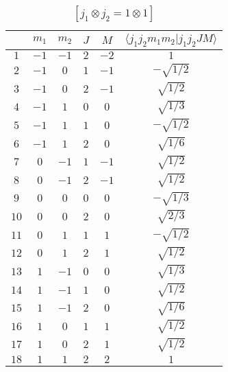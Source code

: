 \begin{table}
\tiny
\caption{$[j_1 \otimes j_2 = 1 \otimes 1]$}
\begin{center}
\begin{tabular}{|c|c|c|c|c|c|}
\hline 
   & $m_1$ & $m_2$ & $J$ & $M$ & $\langle j_1 j_2 m_1 m_2 | j_1 j_2 J M \rangle$ \\ 
\hline 
$1$ & $-1$ & $-1$ & $2$ & $-2$ & $1$ \\ 
$2$ & $-1$ & $0$ & $1$ & $-1$ & $-\sqrt{1/2}$ \\ 
$3$ & $-1$ & $0$ & $2$ & $-1$ & $\sqrt{1/2}$ \\ 
$4$ & $-1$ & $1$ & $0$ & $0$ & $\sqrt{1/3}$ \\ 
$5$ & $-1$ & $1$ & $1$ & $0$ & $-\sqrt{1/2}$ \\ 
$6$ & $-1$ & $1$ & $2$ & $0$ & $\sqrt{1/6}$ \\ 
$7$ & $0$ & $-1$ & $1$ & $-1$ & $\sqrt{1/2}$ \\ 
$8$ & $0$ & $-1$ & $2$ & $-1$ & $\sqrt{1/2}$ \\ 
$9$ & $0$ & $0$ & $0$ & $0$ & $-\sqrt{1/3}$ \\ 
$10$ & $0$ & $0$ & $2$ & $0$ & $\sqrt{2/3}$ \\ 
$11$ & $0$ & $1$ & $1$ & $1$ & $-\sqrt{1/2}$ \\ 
$12$ & $0$ & $1$ & $2$ & $1$ & $\sqrt{1/2}$ \\ 
$13$ & $1$ & $-1$ & $0$ & $0$ & $\sqrt{1/3}$ \\ 
$14$ & $1$ & $-1$ & $1$ & $0$ & $\sqrt{1/2}$ \\ 
$15$ & $1$ & $-1$ & $2$ & $0$ & $\sqrt{1/6}$ \\ 
$16$ & $1$ & $0$ & $1$ & $1$ & $\sqrt{1/2}$ \\ 
$17$ & $1$ & $0$ & $2$ & $1$ & $\sqrt{1/2}$ \\ 
$18$ & $1$ & $1$ & $2$ & $2$ & $1$ \\ 
\hline 
\end{tabular}
\end{center}
\end{table}

